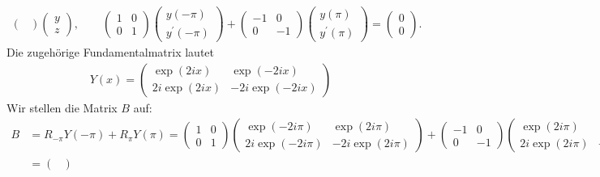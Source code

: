 \begin{solution}
\begin{enumerate}[label = \textbf{\alph*)}]
\begin{align*}
\begin{pmatrix}
    \end{pmatrix}
    \begin{pmatrix}
      y \\ z
    \end{pmatrix}, \qquad
    \begin{pmatrix}
      1 & 0 \\ 0 & 1
    \end{pmatrix}
    \begin{pmatrix}
      y(-\pi) \\ y^{\prime}(-\pi)
    \end{pmatrix}
    +
    \begin{pmatrix}
      -1 & 0 \\ 0 & -1
    \end{pmatrix}
    \begin{pmatrix}
      y(\pi) \\ y^{\prime}(\pi)
    \end{pmatrix}
    =
    \begin{pmatrix}
      0 \\ 0
    \end{pmatrix}.
  \end{align*}
  Die zugehörige Fundamentalmatrix lautet
  \begin{align*}
    Y(x) = \begin{pmatrix}
      \exp(2ix) & \exp(-2ix) \\ 2i\exp(2ix) & -2i\exp(-2ix)
    \end{pmatrix}
  \end{align*}
  Wir stellen die Matrix $B$ auf:
  \begin{align*}
    B &= R_{-\pi}Y(-\pi) + R_{\pi}Y(\pi) =
    \begin{pmatrix}
      1 & 0 \\ 0 & 1
    \end{pmatrix}
    \begin{pmatrix}
      \exp(-2i\pi) & \exp(2i\pi) \\ 2i\exp(-2i\pi) & -2i\exp(2i\pi)
    \end{pmatrix} +
    \begin{pmatrix}
      -1 & 0 \\ 0 & -1
    \end{pmatrix}
    \begin{pmatrix}
      \exp(2i\pi) & \exp(-2i\pi) \\ 2i\exp(2i\pi) & -2i\exp(-2i\pi)
    \end{pmatrix} \\
    &= \begin{pmatrix}

\end{pmatrix}
\end{align*}
\end{enumerate}
\end{solution}
